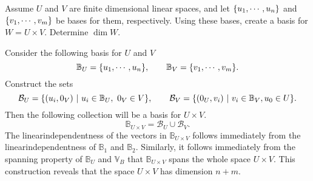 \begin{problem}
	Assume $ U $ and $ V $ are finite dimensional linear spaces, and let $ \{u_1,\cdots,u_n\} $ and $ \{v_1,\cdots,v_m\} $ be bases for them, respectively. Using these bases, create a basis for $ W = U\times V $. Determine $ \dim W $.
\end{problem}

\begin{solution}
	Consider the following basis for $ U $ and $ V $ 
	\[ \mathbb{B}_U = \{u_1,\cdots,u_n\}, \qquad \mathbb{B}_V = \{v_1,\cdots,v_m\}. \]
	Construct the sets
	\[ \mathcal{B}_U = \set{(u_i, 0_V)\ |\ u_i \in\mathbb{B}_U,\ 0_V \in V}, \qquad \mathcal{B}_V = \set{(0_U, v_i)\ |\ v_i \in \mathbb{B}_V, u_0 \in U}. \]
	Then the following collection will be a basis for $ U \times V $.
	\[ \mathbb{B}_{U\times V} = \mathcal{B}_U \cup \mathcal{B}_V. \]
	The linearindependentness of the vectors in $ \mathbb{B}_{U\times V}  $ follows immediately from the linearindependentness of $ \mathbb{B}_1 $ and $ \mathbb{B}_2 $. Similarly, it follows immediately from the spanning property of $ \mathbb{B}_U $ and $ \mathbb{V}_B $ that $ \mathbb{B}_{U\times V} $ spans the whole space $ U\times V $. This construction reveals that the space $ U\times V $ has dimension $ n+m $.
\end{solution}
